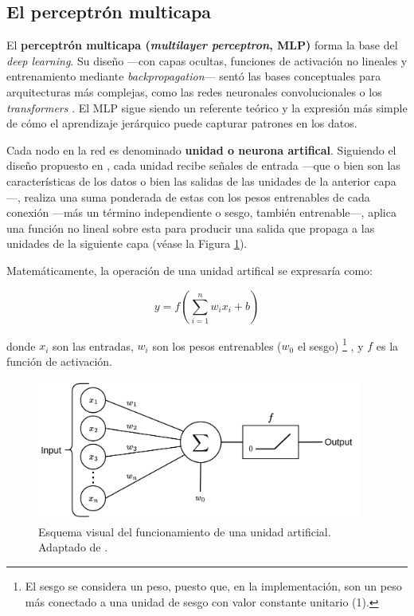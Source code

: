 \subsection{El perceptrón multicapa}

El \textbf{perceptrón multicapa (\textit{multilayer perceptron}, MLP)} forma la base del \textit{deep learning}. Su diseño ---con capas ocultas, funciones de activación no lineales y entrenamiento  mediante \textit{backpropagation}--- sentó las bases conceptuales para arquitecturas más complejas, como las redes neuronales convolucionales o los \textit{transformers} \cite{murphy2022}. El \acrshort{MLP} sigue siendo un referente teórico y la expresión más simple de cómo el aprendizaje jerárquico puede capturar patrones en los datos. 

Cada nodo en la red es denominado \textbf{unidad o neurona artifical}. Siguiendo el diseño propuesto en \cite{mcculloch1943,rosenblatt1958}, cada unidad recibe señales de entrada ---que o bien son las características de los datos o bien las salidas de las unidades de la anterior capa---, realiza una suma ponderada de estas con los pesos entrenables de cada conexión ---más un término independiente o sesgo, también entrenable---, aplica una función no lineal sobre esta para producir una salida que propaga a las unidades de la siguiente capa (véase la Figura \ref{fig:neuron_MLP}).

Matemáticamente, la operación de una unidad artifical se expresaría como:

$$
y = f \left( \sum_{i=1}^n{w_ix_i+b} \right)
$$

donde $x_i$ son las entradas, $w_i$ son los pesos entrenables ($w_0$ el sesgo)%
\footnote{
    El sesgo se considera un peso, puesto que, en la implementación, son un peso más conectado a una unidad de sesgo con valor constante unitario (1).
}
, y $f$ es la función de activación.

\begin{figure}[htbp]
    \centering
    \includegraphics[width=0.95\textwidth]{capitulos/cap_02/imagenes/Neuron_perceptron.png}
    \caption{
        Esquema visual del funcionamiento de una unidad artificial. Adaptado de 
        \cite{codeworld2022understandingMLDL}.
    } 
    \label{fig:neuron_MLP}
\end{figure}


